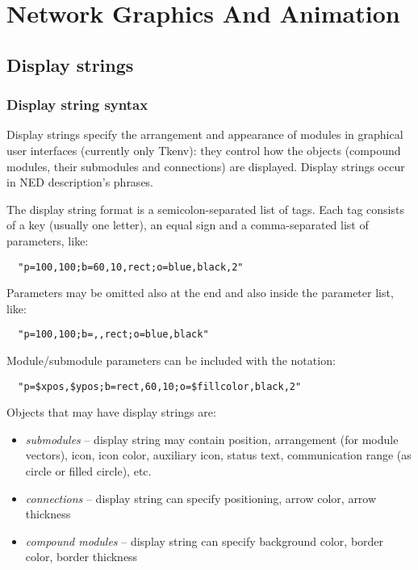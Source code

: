 \chapter{Network Graphics And Animation}
\label{cha:graphics}

\section{Display strings}
\label{sec:ch-graphics:display-strings}

\subsection{Display string syntax}

Display strings specify the arrangement and
appearance of modules in graphical user interfaces (currently only
Tkenv): they control how the objects (compound modules, their
submodules and connections) are displayed. Display strings occur in
NED description's 
phrases.

The display string format is a semicolon-separated list of tags.
Each tag consists of a key (usually one letter), an equal sign
and a comma-separated list of parameters, like:

\begin{verbatim}
  "p=100,100;b=60,10,rect;o=blue,black,2"
\end{verbatim}

Parameters may be omitted also at the end and also inside the
parameter list, like:

\begin{verbatim}
  "p=100,100;b=,,rect;o=blue,black"
\end{verbatim}

Module/submodule parameters can be included with the  notation:

\begin{verbatim}
  "p=$xpos,$ypos;b=rect,60,10;o=$fillcolor,black,2"
\end{verbatim}

Objects that may have display strings are:
\begin{itemize}
  \item \textit{submodules} -- display string may contain position, arrangement
        (for module vectors), icon, icon color, auxiliary icon, status text,
        communication range (as circle or filled circle), etc.
  \item \textit{connections} -- display string can specify positioning, arrow color,
        arrow thickness
  \item \textit{compound modules} -- display string can specify background color,
        border color, border thickness
\end{itemize}


